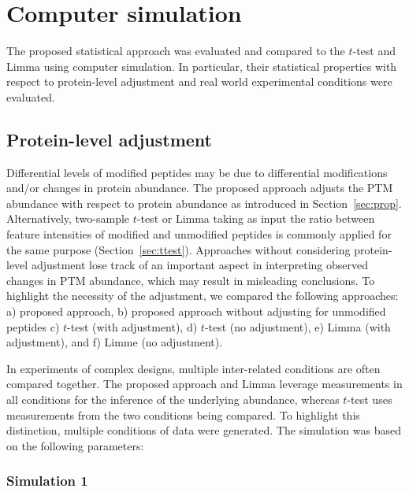 \documentclass{mcp}
\def\secref#1{Section~\ref{#1}}
\begin{document}
\clearpage
\section{Computer simulation}
\label{sec:sim}

The proposed statistical approach was evaluated and compared to the $t$-test and Limma using computer simulation. In particular, their statistical properties with respect to protein-level adjustment and real world experimental conditions were evaluated.


\subsection{Protein-level adjustment}

Differential levels of modified peptides may be due to differential modifications and/or changes in protein abundance. The proposed approach adjusts the PTM abundance with respect to protein abundance as introduced in \secref{sec:prop}. Alternatively, two-sample $t$-test or Limma taking as input the ratio between feature intensities of modified and unmodified peptides is commonly applied for the same purpose (\secref{sec:ttest}). 
Approaches without considering protein-level adjustment lose track of an important aspect in interpreting observed changes in PTM abundance, which may result in misleading conclusions. To highlight the necessity of the adjustment, we compared the following approaches: a) proposed approach, b) proposed approach without adjusting for unmodified peptides c) $t$-test (with adjustment), d) $t$-test (no adjustment), e) Limma (with adjustment), and f) Limme (no adjustment).

In experiments of complex designs, multiple inter-related conditions are often compared together. The proposed approach and Limma leverage measurements in all conditions for the inference of the underlying abundance, whereas $t$-test uses measurements from the two conditions being compared. To highlight this distinction, multiple conditions of data were generated. The simulation was based on the following parameters: 

\subsubsection{Simulation 1}
\end{document}
